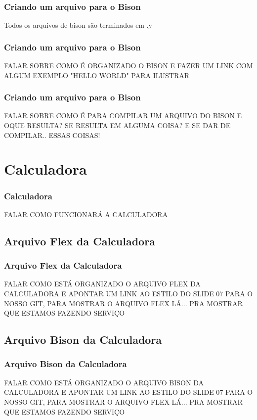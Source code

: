 \documentclass{beamer}
\begin{document}
\begin{frame}
\frametitle{Criando um arquivo para o Bison}
	
	Todos os arquivos de bison são terminados em .y

\end{frame}

\begin{frame}
\frametitle{Criando um arquivo para o Bison}
		FALAR SOBRE COMO É ORGANIZADO O BISON E FAZER UM LINK COM ALGUM EXEMPLO "HELLO WORLD" PARA ILUSTRAR
	
\end{frame}

\begin{frame}
\frametitle{Criando um arquivo para o Bison}
		FALAR SOBRE COMO É PARA COMPILAR UM ARQUIVO DO BISON E OQUE RESULTA? SE RESULTA EM ALGUMA COISA? E SE DAR 
		DE COMPILAR.. ESSAS COISAS!
	
\end{frame}
\section{Calculadora}
\begin{frame}
\frametitle{Calculadora}
FALAR COMO FUNCIONARÁ A CALCULADORA
\end{frame}

\subsection{Arquivo Flex da Calculadora}

\begin{frame}
\frametitle{Arquivo Flex da Calculadora}
FALAR COMO ESTÁ ORGANIZADO O ARQUIVO FLEX DA CALCULADORA E APONTAR UM LINK AO ESTILO DO SLIDE 07 PARA O NOSSO GIT, PARA MOSTRAR
O ARQUIVO FLEX LÁ... PRA MOSTRAR QUE ESTAMOS FAZENDO SERVIÇO


\end{frame}

\subsection{Arquivo Bison da Calculadora}

\begin{frame}
\frametitle{Arquivo Bison da Calculadora}
FALAR COMO ESTÁ ORGANIZADO O ARQUIVO BISON DA CALCULADORA E APONTAR UM LINK AO ESTILO DO SLIDE 07 PARA O NOSSO GIT, PARA MOSTRAR
O ARQUIVO FLEX LÁ... PRA MOSTRAR QUE ESTAMOS FAZENDO SERVIÇO

\end{frame}
\end{document}
